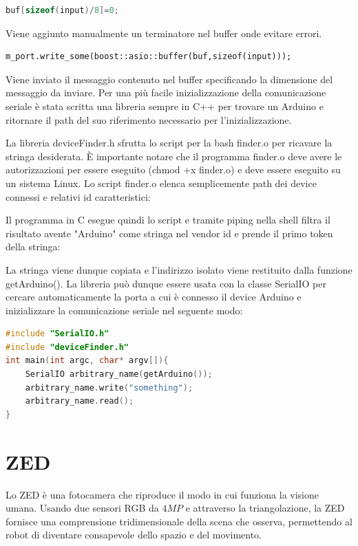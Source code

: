 \documentclass[a4paper]{article}
\begin{document}
\begin{lstlisting}[language=C++,firstnumber=27]
buf[sizeof(input)/8]=0;
\end{lstlisting}
Viene aggiunto manualmente un terminatore nel buffer onde evitare errori.

\begin{lstlisting}
m_port.write_some(boost::asio::buffer(buf,sizeof(input)));
\end{lstlisting}
Viene inviato il messaggio contenuto nel buffer specificando la dimensione del messaggio da inviare.
\newpage
Per una più facile inizializzazione della comunicazione seriale è stata scritta una libreria sempre in C++ per trovare un Arduino e ritornare il path del suo riferimento necessario per l'inizializzazione.




La libreria deviceFinder.h sfrutta lo script per la bash finder.o per ricavare la stringa desiderata.
È importante notare che il programma finder.o deve avere le autorizzazioni per essere eseguito (chmod +x finder.o) e deve essere eseguito su un sistema Linux.
Lo script finder.o elenca semplicemente path dei device connessi e relativi id caratteristici:

Il programma in C esegue quindi lo script e tramite piping nella shell filtra il risultato avente "Arduino" come stringa nel vendor id e prende il primo token della stringa:

La stringa viene dunque copiata e l'indirizzo isolato viene restituito dalla funzione getArduino().
La libreria può dunque essere usata con la classe SerialIO per cercare automaticamente la porta a cui è connesso il device Arduino e inizializzare la comunicazione seriale nel seguente modo:
\begin{lstlisting}[language=C++]
#include "SerialIO.h"
#include "deviceFinder.h"
int main(int argc, char* argv[]){
    SerialIO arbitrary_name(getArduino());
    arbitrary_name.write("something");
    arbitrary_name.read();
}
\end{lstlisting}

\newpage




\section{ZED}
Lo ZED è una fotocamera che riproduce il modo in cui funziona la visione umana. Usando due sensori RGB da $4MP$ e attraverso la triangolazione, la ZED fornisce una comprensione tridimensionale della scena che osserva, permettendo al robot di diventare consapevole dello spazio e del movimento.
\end{document}
